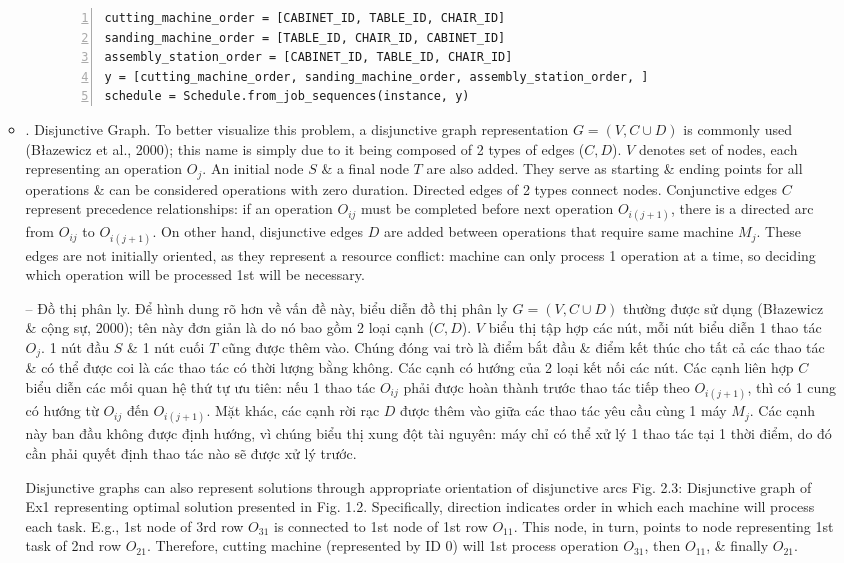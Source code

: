 \documentclass{article}
\begin{document}
\begin{itemize}
\begin{itemize}
\begin{itemize}
\begin{Verbatim}[numbers=left,xleftmargin=5mm]
cutting_machine_order = [CABINET_ID, TABLE_ID, CHAIR_ID]
sanding_machine_order = [TABLE_ID, CHAIR_ID, CABINET_ID]
assembly_station_order = [CABINET_ID, TABLE_ID, CHAIR_ID]
y = [cutting_machine_order, sanding_machine_order, assembly_station_order, ]
schedule = Schedule.from_job_sequences(instance, y)
            \end{Verbatim}
        \end{itemize}
        \item {. Disjunctive Graph.} To better visualize this problem, a disjunctive graph representation $G = (V,C\cup D)$ is commonly used (Błazewicz et al., 2000); this name is simply due to it being composed of 2 types of edges ($C,D$). $V$ denotes set of nodes, each representing an operation $O_j$. An initial node $S$ \& a final node $T$ are also added. They serve as starting \& ending points for all operations \& can be considered operations with zero duration. Directed edges of 2 types connect nodes. Conjunctive edges $C$ represent precedence relationships: if an operation $O_{ij}$ must be completed before next operation $O_{i(j + 1)}$, there is a directed arc from $O_{ij}$ to $O_{i(j + 1)}$. On other hand, disjunctive edges $D$ are added between operations that require same machine $M_j$. These edges are not initially oriented, as they represent a resource conflict: machine can only process 1 operation at a time, so deciding which operation will be processed 1st will be necessary.

        -- {\sf Đồ thị phân ly.} Để hình dung rõ hơn về vấn đề này, biểu diễn đồ thị phân ly $G = (V,C\cup D)$ thường được sử dụng (Błazewicz \& cộng sự, 2000); tên này đơn giản là do nó bao gồm 2 loại cạnh ($C,D$). $V$ biểu thị tập hợp các nút, mỗi nút biểu diễn 1 thao tác $O_j$. 1 nút đầu $S$ \& 1 nút cuối $T$ cũng được thêm vào. Chúng đóng vai trò là điểm bắt đầu \& điểm kết thúc cho tất cả các thao tác \& có thể được coi là các thao tác có thời lượng bằng không. Các cạnh có hướng của 2 loại kết nối các nút. Các cạnh liên hợp $C$ biểu diễn các mối quan hệ thứ tự ưu tiên: nếu 1 thao tác $O_{ij}$ phải được hoàn thành trước thao tác tiếp theo $O_{i(j + 1)}$, thì có 1 cung có hướng từ $O_{ij}$ đến $O_{i(j + 1)}$. Mặt khác, các cạnh rời rạc $D$ được thêm vào giữa các thao tác yêu cầu cùng 1 máy $M_j$. Các cạnh này ban đầu không được định hướng, vì chúng biểu thị xung đột tài nguyên: máy chỉ có thể xử lý 1 thao tác tại 1 thời điểm, do đó cần phải quyết định thao tác nào sẽ được xử lý trước.

        Disjunctive graphs can also represent solutions through appropriate orientation of disjunctive arcs {\sf Fig. 2.3: Disjunctive graph of Ex1 representing optimal solution presented in Fig. 1.2}. Specifically, direction indicates order in which each machine will process each task. E.g., 1st node of 3rd row $O_{31}$ is connected to 1st node of 1st row $O_{11}$. This node, in turn, points to node representing 1st task of 2nd row $O_{21}$. Therefore, cutting machine (represented by ID 0) will 1st process operation $O_{31}$, then $O_{11}$, \& finally $O_{21}$.


\end{itemize}
\end{itemize}
\end{document}
